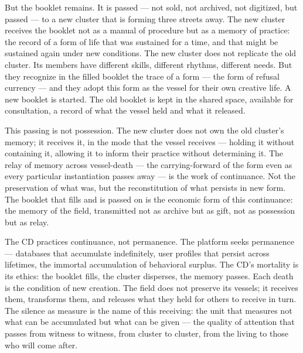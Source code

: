 But the booklet remains. It is passed — not sold, not archived, not digitized, but passed — to a new cluster that is forming three streets away. The new cluster receives the booklet not as a manual of procedure but as a memory of practice: the record of a form of life that was sustained for a time, and that might be sustained again under new conditions. The new cluster does not replicate the old cluster. Its members have different skills, different rhythms, different needs. But they recognize in the filled booklet the trace of a form — the form of refusal currency — and they adopt this form as the vessel for their own creative life. A new booklet is started. The old booklet is kept in the shared space, available for consultation, a record of what the vessel held and what it released.

This passing is not possession. The new cluster does not own the old cluster's memory; it receives it, in the mode that the vessel receives — holding it without containing it, allowing it to inform their practice without determining it. The relay of memory across vessel-death — the carrying-forward of the form even as every particular instantiation passes away — is the work of continuance. Not the preservation of what was, but the reconstitution of what persists in new form. The booklet that fills and is passed on is the economic form of this continuance: the memory of the field, transmitted not as archive but as gift, not as possession but as relay.

The CD practices continuance, not permanence. The platform seeks permanence — databases that accumulate indefinitely, user profiles that persist across lifetimes, the immortal accumulation of behavioral surplus. The CD's mortality is its ethics: the booklet fills, the cluster disperses, the memory passes. Each death is the condition of new creation. The field does not preserve its vessels; it receives them, transforms them, and releases what they held for others to receive in turn. The silence as measure is the name of this receiving: the unit that measures not what can be accumulated but what can be given — the quality of attention that passes from witness to witness, from cluster to cluster, from the living to those who will come after.